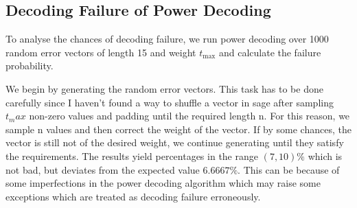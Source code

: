 \documentclass{article}
\begin{document}
\subsection*{Decoding Failure of Power Decoding}
To analyse the chances of decoding failure, we run power decoding over 1000 random error vectors of length 15 and weight $t_{\text{max}}$
and calculate the failure probability.

We begin by generating the random error vectors. This task has to be done carefully since I haven't found a way to shuffle a vector in sage after sampling $t_max $ non-zero values and padding until the required length n. For this reason, we sample n values and then correct the weight of the vector. If by some chances, the vector is still not of the desired weight, we continue generating until they satisfy the requirements. The results yield percentages in the range $(7,10)\%$ which is not bad, but deviates from the expected value $6.6667\%$. This can be because of some imperfections in the power decoding algorithm which may raise some exceptions which are treated as decoding failure erroneously.
\end{document}
